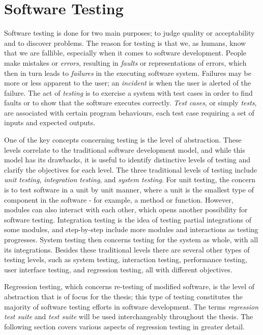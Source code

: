 \documentclass[a4paper,english,12pt]{report}
\begin{document}
\section{Software Testing}
Software testing is done for two main purposes; to judge quality or acceptability and to discover problems. The reason for testing is that we, as humans, know that we are fallible, especially when it comes to software development. People make mistakes or \textit{errors}, resulting in \textit{faults} or representations of errors, which then in turn leads to \textit{failures} in the executing software system. Failures may be more or less apparent to the user; an \textit{incident} is when the user is alerted of the failure. The act of \textit{testing} is to exercise a system with test cases in order to find faults or to show that the software executes correctly. \textit{Test cases}, or simply \textit{tests}, are associated with certain program behaviours, each test case requiring a set of inputs and expected outputs. \citep[pp. 3-4]{jorgensen2002software}

One of the key concepts concerning testing is the level of abstraction. These levels correlate to the traditional software development model, and while this model has its drawbacks, it is useful to identify distinctive levels of testing and clarify the objectives for each level. \citep[pp. 13]{jorgensen2002software} The three traditional levels of testing include \textit{unit testing}, \textit{integration testing}, and \textit{system testing}. For unit testing, the concern is to test software in a unit by unit manner, where a unit is the smallest type of component in the software - for example, a method or function. However, modules can also interact with each other, which opens another possibility for software testing. Integration testing is the idea of testing partial integrations of some modules, and step-by-step include more modules and interactions as testing progresses. System testing then concerns testing for the system as whole, with all its integrations. \citep[pp. 187-188]{jorgensen2002software} Besides these traditional levels there are several other types of testing levels, such as system testing, interaction testing, performance testing, user interface testing, and regression testing, all with different objectives.

Regression testing, which concerns re-testing of modified software, is the level of abstraction that is of focus for the thesis; this type of testing constitutes the majority of software testing efforts in software development. \citep[p. 215]{ammann2008introduction} The terms \textit{regression test suite} and \textit{test suite} will be used interchangeably throughout the thesis. The following section covers various aspects of regression testing in greater detail.
\end{document}
